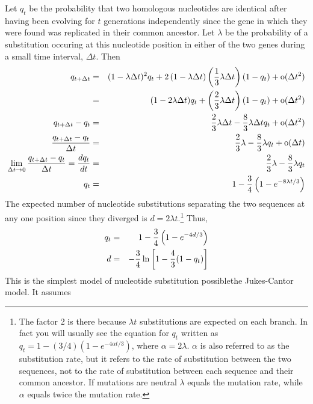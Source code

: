 Let $q_t$ be the probability that two homologous nucleotides are
identical after having been evolving for $t$ generations independently
since the gene in which they were found was replicated in their common
ancestor. Let $\lambda$ be the probability of a substitution occuring
at this nucleotide position in either of the two genes during a small
time interval, $\Delta t$. Then
\begin{eqnarray*}
q_{t+\Delta t} &=& (1 - \lambda\Delta t)^2q_t
                  + 2\left(1 - \lambda\Delta t\right)\left({1 \over
                           3}\lambda\Delta t\right)(1 - q_t)
                  + \hbox{o}(\Delta t^2) \\
               &=& (1 - 2\lambda\Delta t)q_t + \left({2 \over 3}\lambda
                                                    \Delta t\right)
                                              (1 - q_t) 
                  + \hbox{o}(\Delta t^2) \\
q_{t+\Delta t} - q_t &=& {2 \over 3}\lambda\Delta t - {8 \over
                           3}\lambda\Delta tq_t + \hbox{o}(\Delta t^2) \\
{q_{t+\Delta t} - q_t \over \Delta t} &=& {2 \over 3}\lambda - {8 \over
3}\lambda q_t + \hbox{o}(\Delta t) \\
\lim_{\Delta t\to 0}{q_{t+\Delta t} - q_t \over \Delta t}  = {dq_t \over dt} &=& {2 \over 3}\lambda - {8
\over 3}\lambda q_t \\
q_t &=& 1 - {3 \over 4}\left(1 - e^{-8\lambda t/3}\right) \\
\end{eqnarray*}
The expected number of nucleotide substitutions separating the two
sequences at any one position since they diverged is $d = 2\lambda
t$.\footnote{The factor 2 is there because $\lambda t$ substitutions
  are expected on each branch. In fact you will usually see the
  equation for $q_t$ written as $q_t = 1 - (3/4)\left(1 - e^{-4\alpha
      t/3}\right)$, where $\alpha = 2\lambda$. $\alpha$ is also
  referred to as the substitution rate, but it refers to the rate of
  substitution between the two sequences, not to the rate of
  substitution between each sequence and their common ancestor. If
  mutations are neutral $\lambda$ equals the mutation rate, while
  $\alpha$ equals twice the mutation rate.} Thus,
\begin{eqnarray*}
q_t &=& 1 - {3 \over 4}\left(1 - e^{-4d/3}\right) \\
d   &=& -{3 \over 4}\ln\left[1 - {4 \over 3}(1 - q_t)\right] \\
\end{eqnarray*}
This is the simplest model of nucleotide substitution
possible{\dash}the Jukes-Cantor model. It assumes

